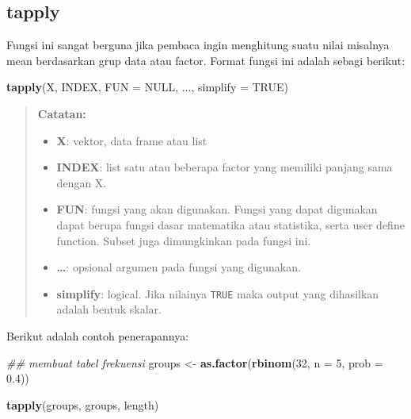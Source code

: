 \documentclass[]{book}
\newenvironment{Shaded}{\begin{snugshade}}{\end{snugshade}}
\newcommand{\CommentTok}[1]{\textcolor[rgb]{0.56,0.35,0.01}{\textit{#1}}}
\newcommand{\DataTypeTok}[1]{\textcolor[rgb]{0.13,0.29,0.53}{#1}}
\newcommand{\DecValTok}[1]{\textcolor[rgb]{0.00,0.00,0.81}{#1}}
\newcommand{\FloatTok}[1]{\textcolor[rgb]{0.00,0.00,0.81}{#1}}
\newcommand{\KeywordTok}[1]{\textcolor[rgb]{0.13,0.29,0.53}{\textbf{#1}}}
\newcommand{\NormalTok}[1]{#1}
\newcommand{\OtherTok}[1]{\textcolor[rgb]{0.56,0.35,0.01}{#1}}
\newcommand{\StringTok}[1]{\textcolor[rgb]{0.31,0.60,0.02}{#1}}
\providecommand{\tightlist}{%
  \setlength{\itemsep}{0pt}\setlength{\parskip}{0pt}}
\theoremstyle{definition}
\theoremstyle{definition}
\theoremstyle{definition}
\theoremstyle{remark}
\begin{document}
\hypertarget{tapply}{%
\subsection{tapply}\label{tapply}}

Fungsi ini sangat berguna jika pembaca ingin menghitung suatu nilai misalnya mean berdasarkan grup data atau factor. Format fungsi ini adalah sebagi berikut:

\begin{Shaded}
\begin{Highlighting}[]
\KeywordTok{tapply}\NormalTok{(X, INDEX, }\DataTypeTok{FUN =} \OtherTok{NULL}\NormalTok{, ..., }\DataTypeTok{simplify =} \OtherTok{TRUE}\NormalTok{)}
\end{Highlighting}
\end{Shaded}

\begin{quote}
\textbf{Catatan:}

\begin{itemize}
\tightlist
\item
  \textbf{X}: vektor, data frame atau list
\item
  \textbf{INDEX}: list satu atau beberapa factor yang memiliki panjang sama dengan X.
\item
  \textbf{FUN}: fungsi yang akan digunakan. Fungsi yang dapat digunakan dapat berupa fungsi dasar matematika atau statistika, serta user define function. Subset juga dimungkinkan pada fungsi ini.
\item
  \textbf{\ldots{}}: opsional argumen pada fungsi yang digunakan.
\item
  \textbf{simplify}: logical. Jika nilainya \texttt{TRUE} maka output yang dihasilkan adalah bentuk skalar.
\end{itemize}
\end{quote}

Berikut adalah contoh penerapannya:

\begin{Shaded}
\begin{Highlighting}[]
\CommentTok{## membuat tabel frekuensi}
\NormalTok{groups <-}\StringTok{ }\KeywordTok{as.factor}\NormalTok{(}\KeywordTok{rbinom}\NormalTok{(}\DecValTok{32}\NormalTok{, }\DataTypeTok{n =} \DecValTok{5}\NormalTok{, }\DataTypeTok{prob =} \FloatTok{0.4}\NormalTok{))}

\KeywordTok{tapply}\NormalTok{(groups, groups, length)}
\end{Highlighting}
\end{Shaded}
\end{document}
